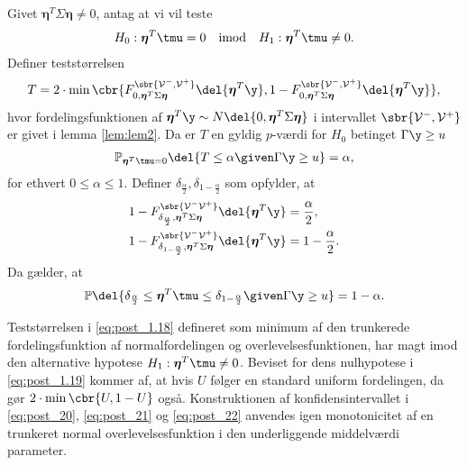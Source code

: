 \begin{lem} \label{lem:lem4}
Givet \(\boldsymbol{\eta}^T \Sigma \boldsymbol{\eta} \neq 0\), antag at vi vil teste
\begin{align*}
H_0: \boldsymbol{\eta}^T \tmu=0 \quad \text{imod} \quad H_1: \boldsymbol{\eta}^T \tmu \neq 0.
\end{align*}
Definer teststørrelsen
\begin{align}
T=2 \cdot \min\cbr{F_{0, \boldsymbol{\eta}^T \Sigma \boldsymbol{\eta}}^{\sbr{\mathcal{V}^-, \mathcal{V}^+}} \del{\boldsymbol{\eta}^T \y}, 1 - F_{0, \boldsymbol{\eta}^T \Sigma \boldsymbol{\eta}}^{\sbr{\mathcal{V}^-, \mathcal{V}^+}} \del{\boldsymbol{\eta}^T \y}}, \label{eq:post_1.18}
\end{align}
hvor fordelingsfunktionen af \(\boldsymbol{\eta}^T \y \sim N \del{0,  \boldsymbol{\eta}^T \Sigma \boldsymbol{\eta}}\) i intervallet \(\sbr{\mathcal{V}^-, \mathcal{V}^+}\) er givet i lemma \ref{lem:lem2}.
Da er \(T\) en gyldig \(p\)-værdi for \(H_0\) betinget \(\Gamma \y \geq u\)
\begin{align}
\mathbb{P}_{\boldsymbol{\eta}^T \tmu=0} \del{T \leq \alpha \given \Gamma \y \geq u} = \alpha, \label{eq:post_1.19}
\end{align}
for ethvert \(0 \leq \alpha \leq 1\). 
Definer \(\delta_{\frac{\alpha}{2}}, \delta_{1-\frac{\alpha}{2}}\) som opfylder, at
\begin{align}
1-F_{\delta_{\frac{\alpha}{2}}, \boldsymbol{\eta}^T \Sigma \boldsymbol{\eta}}^{\sbr{\mathcal{V}^- \mathcal{V}^+}} \del{\boldsymbol{\eta}^T \y} &= \frac{\alpha}{2}, \label{eq:post_20} \\
1-F_{\delta_{1-\frac{\alpha}{2}}, \boldsymbol{\eta}^T \Sigma \boldsymbol{\eta} }^{\sbr{\mathcal{V}^- \mathcal{V}^+}} \del{\boldsymbol{\eta}^T \y} &= 1-\frac{\alpha}{2}. \label{eq:post_21}
\end{align}
Da gælder, at
\begin{align}
\mathbb{P} \del{\delta_{\frac{\alpha}{2}} \leq  \boldsymbol{\eta}^T \tmu \leq \delta_{1-\frac{\alpha}{2}} \given \Gamma \y \geq u} = 1- \alpha. \label{eq:post_22}
\end{align}
\end{lem}
%
Teststørrelsen i \eqref{eq:post_1.18} defineret som minimum af den trunkerede fordelingsfunktion af normalfordelingen og overlevelsesfunktionen, har magt imod den alternative hypotese \(H_1: \boldsymbol{\eta}^T \tmu \neq 0\).
Beviset for dens nulhypotese i \eqref{eq:post_1.19} kommer af, at hvis \(U\) følger en standard uniform fordelingen, da gør \(2 \cdot \min \cbr{U,1-U}\) også.
Konstruktionen af konfidensintervallet i \eqref{eq:post_20}, \eqref{eq:post_21} og \eqref{eq:post_22} anvendes igen monotonicitet af en trunkeret normal overlevelsesfunktion i den underliggende middelværdi parameter.


